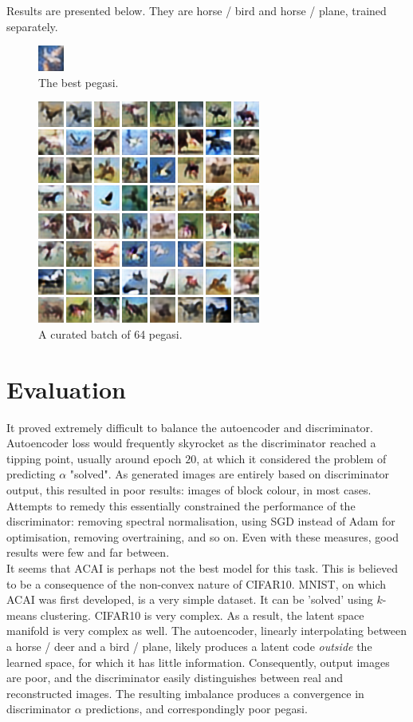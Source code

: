 \documentclass[11pt]{article} %
\begin{document}
Results are presented below. They are horse / bird and horse / plane, trained separately.

\begin{figure}[h!]
  \centering
  \includegraphics{best.png}
  \caption{The best pegasi.}
\end{figure}

\begin{figure}[h!]
  \centering
  \includegraphics{batch.png}
  \caption{A curated batch of 64 pegasi.}
\end{figure}

\section{Evaluation}

It proved extremely difficult to balance the autoencoder and discriminator. Autoencoder loss would frequently skyrocket as the discriminator reached a tipping point, usually around epoch $20$, at which it considered the problem of predicting $\alpha$ "solved". As generated images are entirely based on discriminator output, this resulted in poor results: images of block colour, in most cases. Attempts to remedy this essentially constrained the performance of the discriminator: removing spectral normalisation, using SGD instead of Adam for optimisation, removing overtraining, and so on. Even with these measures, good results were few and far between. \\

It seems that ACAI is perhaps not the best model for this task. This is believed to be a consequence of the non-convex nature of CIFAR10. MNIST, on which ACAI was first developed, is a very simple dataset. It can be 'solved' using $k$-means clustering. CIFAR10 is very complex. As a result, the latent space manifold is very complex as well. The autoencoder, linearly interpolating between a horse / deer and a bird / plane, likely produces a latent code \textit{outside} the learned space, for which it has little information. Consequently, output images are poor, and the discriminator easily distinguishes between real and reconstructed images. The resulting imbalance produces a convergence in discriminator $\alpha$ predictions, and correspondingly poor pegasi.
\printbibliography
\end{document}
